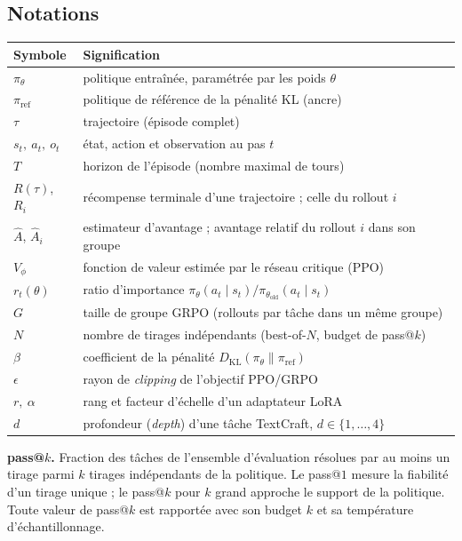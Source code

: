 \documentclass[11pt,a4paper]{article}
\begin{document}
\subsection*{Notations}
\begin{tabular}{ll}
\toprule
Symbole & Signification \\
\midrule
$\pi_\theta$ & politique entraînée, paramétrée par les poids $\theta$ \\
$\pi_{\text{ref}}$ & politique de référence de la pénalité KL (ancre) \\
$\tau$ & trajectoire (épisode complet) \\
$s_t,\ a_t,\ o_t$ & état, action et observation au pas $t$ \\
$T$ & horizon de l'épisode (nombre maximal de tours) \\
$R(\tau)$, $R_i$ & récompense terminale d'une trajectoire ; celle du rollout $i$ \\
$\hat{A}$, $\hat{A}_i$ & estimateur d'avantage ; avantage relatif du rollout $i$ dans son groupe \\
$V_\phi$ & fonction de valeur estimée par le réseau critique (PPO) \\
$r_t(\theta)$ & ratio d'importance $\pi_\theta(a_t \mid s_t)/\pi_{\theta_{\text{old}}}(a_t \mid s_t)$ \\
$G$ & taille de groupe GRPO (rollouts par tâche dans un même groupe) \\
$N$ & nombre de tirages indépendants (best-of-$N$, budget de pass@$k$) \\
$\beta$ & coefficient de la pénalité $D_{\text{KL}}(\pi_\theta \parallel \pi_{\text{ref}})$ \\
$\epsilon$ & rayon de \emph{clipping} de l'objectif PPO/GRPO \\
$r,\ \alpha$ & rang et facteur d'échelle d'un adaptateur LoRA \\
$d$ & profondeur (\emph{depth}) d'une tâche TextCraft, $d \in \{1,\dots,4\}$ \\
\bottomrule
\end{tabular}

\medskip
\noindent\textbf{pass@$k$.} Fraction des tâches de l'ensemble d'évaluation résolues par
au moins un tirage parmi $k$ tirages indépendants de la politique. Le pass@$1$
mesure la fiabilité d'un tirage unique ; le pass@$k$ pour $k$ grand approche le
support de la politique. Toute valeur de pass@$k$ est rapportée avec son budget
$k$ et sa température d'échantillonnage.
\end{document}
